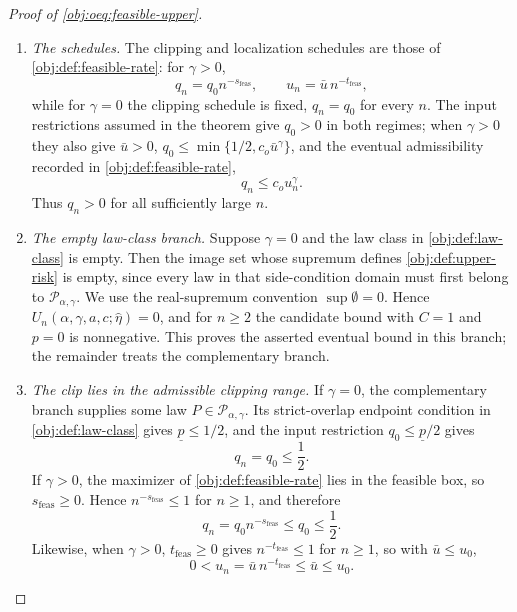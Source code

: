\documentclass[11pt]{article}
\begin{document}
\begin{proof}[Proof of \cref{obj:oeq:feasible-upper}]
\begin{enumerate}
\item \emph{The schedules.}  The clipping and localization schedules are those of \cref{obj:def:feasible-rate}: for \(\gamma>0\),
\[
q_n=q_0n^{-s_{\mathrm{feas}}},\qquad
u_n=\bar u\,n^{-t_{\mathrm{feas}}},
\]
while for \(\gamma=0\) the clipping schedule is fixed, \(q_n=q_0\) for every \(n\).  The input restrictions assumed in the theorem give \(q_0>0\) in both regimes; when \(\gamma>0\) they also give \(\bar u>0\), \(q_0\le\min\{1/2,c_o\bar u^\gamma\}\), and the eventual admissibility recorded in \cref{obj:def:feasible-rate},
\[
q_n\le c_o u_n^\gamma .
\]
Thus \(q_n>0\) for all sufficiently large \(n\). %

\item \emph{The empty law-class branch.}  Suppose \(\gamma=0\) and the law class in \cref{obj:def:law-class} is empty.  Then the image set whose supremum defines \cref{obj:def:upper-risk} is empty, since every law in that side-condition domain must first belong to \(\mathcal P_{\alpha,\gamma}\).  We use the real-supremum convention \(\sup\emptyset=0\).  Hence \(U_n(\alpha,\gamma,a,c;\widehat\eta)=0\), and for \(n\ge2\) the candidate bound with \(C=1\) and \(p=0\) is nonnegative.  This proves the asserted eventual bound in this branch; the remainder treats the complementary branch. %

\item \emph{The clip lies in the admissible clipping range.}  If \(\gamma=0\), the complementary branch supplies some law \(P\in\mathcal P_{\alpha,\gamma}\).  Its strict-overlap endpoint condition in \cref{obj:def:law-class} gives \(\underline p\le1/2\), and the input restriction \(q_0\le\underline p/2\) gives
\[
q_n=q_0\le\frac12 .
\]
If \(\gamma>0\), the maximizer of \cref{obj:def:feasible-rate} lies in the feasible box, so \(s_{\mathrm{feas}}\ge0\).  Hence \(n^{-s_{\mathrm{feas}}}\le1\) for \(n\ge1\), and therefore
\[
q_n=q_0n^{-s_{\mathrm{feas}}}\le q_0\le\frac12 .
\]
Likewise, when \(\gamma>0\), \(t_{\mathrm{feas}}\ge0\) gives \(n^{-t_{\mathrm{feas}}}\le1\) for \(n\ge1\), so with \(\bar u\le u_0\),
\[
0<u_n=\bar u\,n^{-t_{\mathrm{feas}}}\le\bar u\le u_0 .
\]


\end{enumerate}
\end{proof}
\end{document}
